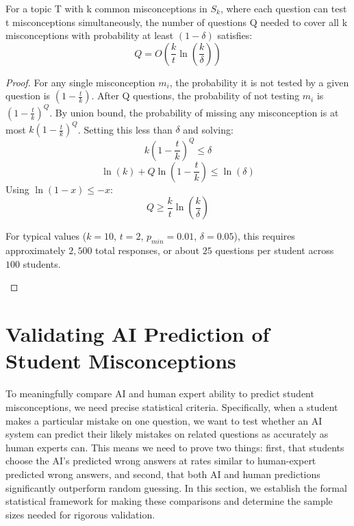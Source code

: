\begin{theorem}
\label{theorem:question_coverage}
For a topic T with k common misconceptions in $S_k$, where each question can test t misconceptions simultaneously, the number of questions Q needed to cover all k misconceptions with probability at least $(1-\delta)$ satisfies:
\[Q = O\left(\frac{k}{t}\ln\left(\frac{k}{\delta}\right)\right)\]
\end{theorem}

\begin{proof}
For any single misconception $m_i$, the probability it is not tested by a given question is $(1-\frac{t}{k})$. After Q questions, the probability of not testing $m_i$ is $(1-\frac{t}{k})^Q$. By union bound, the probability of missing any misconception is at most $k(1-\frac{t}{k})^Q$. Setting this less than $\delta$ and solving:
\[k(1-\frac{t}{k})^Q \leq \delta\]
\[\ln(k) + Q\ln(1-\frac{t}{k}) \leq \ln(\delta)\]
Using $\ln(1-x) \leq -x$:
\[Q \geq \frac{k}{t}\ln(\frac{k}{\delta})\]

\begin{remark}
For typical values ($k = 10$, $t = 2$, $p_{min} = 0.01$, $\delta = 0.05$), this requires approximately $2,500$ total responses, or about $25$ questions per student across $100$ students.
\end{remark}

\end{proof}

\section{Validating AI Prediction of Student Misconceptions}

To meaningfully compare AI and human expert ability to predict student misconceptions, we need precise statistical criteria. Specifically, when a student makes a particular mistake on one question, we want to test whether an AI system can predict their likely mistakes on related questions as accurately as human experts can. This means we need to prove two things: first, that students choose the AI's predicted wrong answers at rates similar to human-expert predicted wrong answers, and second, that both AI and human predictions significantly outperform random guessing. In this section, we establish the formal statistical framework for making these comparisons and determine the sample sizes needed for rigorous validation.

